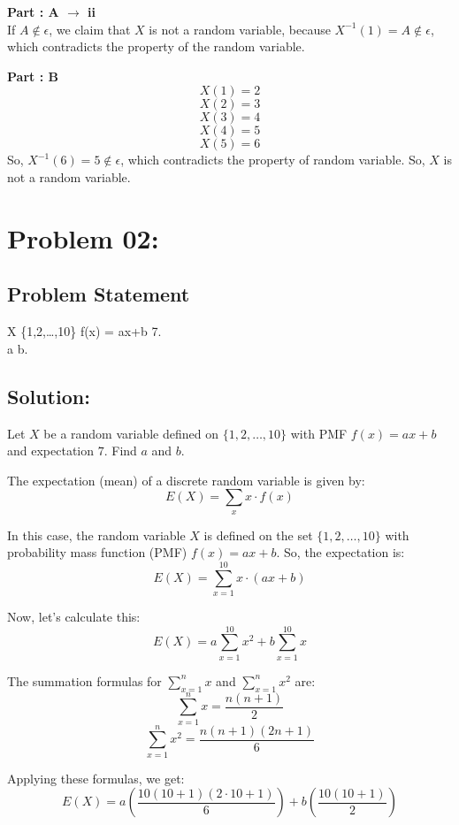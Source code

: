 \documentclass{article}
\theoremstyle{definition}
\begin{document}
\textbf{Part : A $\to$ ii}\\
If $A \notin \epsilon$, we claim that $X$ is not a random variable, because $X^{-1}(1) =A \notin \epsilon $, which contradicts the property of the random variable.


\textbf{Part : B}\\
\[
X(1)=2
\]
\[
X(2)=3
\]
\[
X(3)=4
\]
\[
X(4)=5
\]
\[
X(5)=6
\]
So, $X^{-1}(6) = 5 \notin \epsilon$, which contradicts the property of random variable. So, $X$ is not a random variable.




\vspace{0.5cm}
\section{Problem 02:}
\begin{mdframed}[style = MyFrame]
\subsection{Problem Statement}
 X  \{1,2,\ldots,10\}  f(x) = ax+b  7.\\
 a  b.

\end{mdframed}

\subsection{Solution:}

Let $X$ be a random variable defined on $\{1,2,\ldots,10\}$ with PMF $f(x) = ax+b$ and expectation $7$. Find $a$ and $b$.

The expectation (mean) of a discrete random variable is given by:
\[ E(X) = \sum_{x} x \cdot f(x) \]

In this case, the random variable $X$ is defined on the set $\{1,2,\ldots,10\}$ with probability mass function (PMF) $f(x) = ax + b$. So, the expectation is:
\[ E(X) = \sum_{x=1}^{10} x \cdot (ax + b) \]

Now, let's calculate this:
\[ E(X) = a\sum_{x=1}^{10} x^2 + b\sum_{x=1}^{10} x \]

The summation formulas for $\sum_{x=1}^{n} x$ and $\sum_{x=1}^{n} x^2$ are:
\[ \sum_{x=1}^{n} x = \frac{n(n+1)}{2} \]
\[ \sum_{x=1}^{n} x^2 = \frac{n(n+1)(2n+1)}{6} \]

Applying these formulas, we get:
\[ E(X) = a\left(\frac{10(10+1)(2 \cdot 10+1)}{6}\right) + b\left(\frac{10(10+1)}{2}\right) \]
\end{document}
